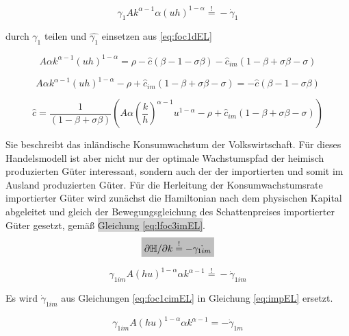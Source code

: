 	\begin{equation}
		\gamma_{1}A k^{\alpha -1} \alpha(u h)^{1- \alpha}\overset{!}{=} - \dot{\gamma}_{1}\label{BedingungFoc3EL}
	\end{equation}


durch $\gamma_1$ teilen und $\hat{\gamma_1}$ einsetzen aus \eqref{eq:foc1dEL}

	\begin{equation*}
		A \alpha k^{\alpha -1} (uh)^{1- \alpha} =\rho-\hat{c}(\beta-1-\sigma\beta)-\hat{c}_{im}(1-\beta+\sigma\beta-\sigma)
	\end{equation*}


	\begin{equation*}
		 A \alpha k^{\alpha -1} (uh)^{1- \alpha}-\rho+\hat{c}_{im}(1-\beta+\sigma\beta-\sigma)=-\hat{c}(\beta-1-\sigma\beta)
	\end{equation*}


	\begin{equation}
		\boxed{
		\hat{c}=\frac{1}{(1-\beta+\sigma\beta)}\left(A\alpha \left(\frac{k}{h}\right)^{\alpha -1}u^{1-\alpha}-\rho+\hat{c}_{im}(1-\beta+\sigma\beta-\sigma)\right)}\label{eq:lKRREL}
	\end{equation}

Sie beschreibt das inländische Konsumwachstum der Volkswirtschaft. Für dieses Handelsmodell ist aber nicht nur der optimale Wachstumspfad der heimisch produzierten Güter interessant, sondern auch der der importierten und somit im Ausland produzierten Güter. Für die Herleitung der Konsumwachstumsrate importierter Güter wird zunächst die Hamiltonian nach dem physischen Kapital abgeleitet und gleich der Bewegungsgleichung des Schattenpreises importierter Güter gesetzt, gemä{\ss} \colorbox{lightgray}{Gleichung \eqref{eq:lfoc3imEL}}.\\


	\begin{equation*}
		\colorbox{lightgray}{$\partial\mathbb{H}/\partial k\overset{!}{=}-\dot{\gamma_{1im}}$}
	\end{equation*}


	\begin{equation}
		\gamma_{1 im}A(hu)^{1- \alpha}\alpha k^{\alpha -1}\overset{!}{=} - \dot{\gamma}_{1im}\label{eq:impEL}
	\end{equation}


Es wird $\dot{\gamma}_{1im}$  aus Gleichungen \eqref{eq:foc1cimEL} in Gleichung \eqref{eq:impEL} ersetzt. 


	\begin{equation*}
		\gamma_{1im}A(hu)^{1- \alpha}\alpha k^{\alpha -1} = - \dot{\gamma}_{1m}
	\end{equation*}


